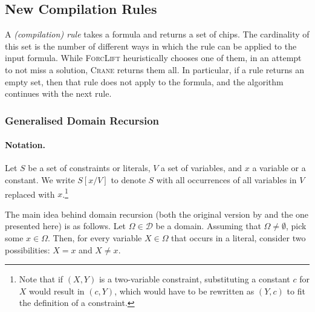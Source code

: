 \subsection{New Compilation Rules}\label{sec:rules}

A \emph{(compilation) rule} takes a formula and returns a set of chips. The
cardinality of this set is the number of different ways in which the rule can be
applied to the input formula. While \textsc{ForcLift}
\citep{DBLP:conf/ijcai/BroeckTMDR11} heuristically chooses one of them, in an
attempt to not miss a solution, \textsc{Crane} returns them all. In particular,
if a rule returns an empty set, then that rule does not apply to the formula,
and the algorithm continues with the next rule.

\subsubsection{Generalised Domain Recursion}\label{sec:dr}

\paragraph*{Notation.}
Let $S$ be a set of constraints or literals, $V$ a set of variables, and $x$ a
variable or a constant. We write $S[x/V]$ to denote $S$ with all occurrences of
all variables in $V$ replaced with $x$.\footnote{Note that if $(X, Y)$ is a
  two-variable constraint, substituting a constant $c$ for $X$ would result in
  $(c, Y)$, which would have to be rewritten as $(Y, c)$ to fit the definition
  of a constraint.}

The main idea behind domain recursion (both the original version by
\citet{DBLP:conf/nips/Broeck11} and the one presented here) is as follows. Let
$\Omega \in \mathcal{D}$ be a domain. Assuming that $\Omega \ne \emptyset$, pick
some $x \in \Omega$. Then, for every variable $X \in \Omega$ that occurs in a
literal, consider two possibilities: $X = x$ and $X \ne x$.

